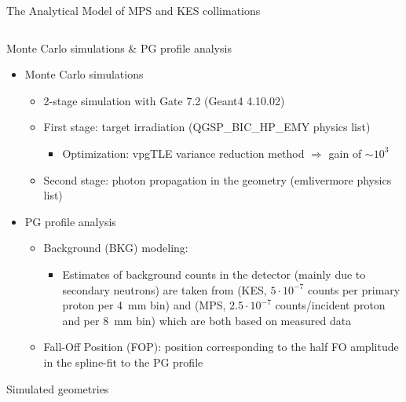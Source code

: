 \documentclass[final]{beamer} %
\begin{document}
\begin{frame}{}
\begin{columns}[t]
\begin{column}{0.49\textwidth}
\begin{block}{The Analytical Model of MPS and KES collimations}
\begin{columns}[t]
\begin{column}{0.49\textwidth}
				\end{column}
			\end{columns}
	  \end{block}
		
	  \begin{block}{Monte Carlo simulations \& PG profile analysis}
			
			\begin{itemize}
				\item Monte Carlo simulations
				\begin{itemize}
					\item 2-stage simulation with Gate 7.2 (Geant4 4.10.02)
					\item First stage: target irradiation (QGSP\_BIC\_HP\_EMY physics list)
					\begin{itemize}
						\item Optimization: vpgTLE variance reduction method $\Rightarrow$ gain of $\sim 10^3$ \cite{Huisman2016}
					\end{itemize}
					\item Second stage: photon propagation in the geometry (emlivermore physics list)
				\end{itemize}					
				\item PG profile analysis
				\begin{itemize}				
					\item Background (BKG) modeling: 
					\begin{itemize}
						\item Estimates of background counts in the detector (mainly due to secondary neutrons) are taken from \cite{Perali2014} (KES, $5 \cdot 10^{-7}$ counts per primary proton per 4~mm bin) and \cite{Pinto2014} (MPS, $2.5\cdot10^{-7}$ counts/incident proton and per 8~mm bin) which are both based on measured data
					\end{itemize}				
					\item Fall-Off Position (FOP): position corresponding to the half FO amplitude in the spline-fit to the PG profile
			\end{itemize}



			\end{itemize}

	  \end{block}		
		
		\begin{block}{Simulated geometries}
		

\end{block}
\end{column}
\end{columns}
\end{frame}
\end{document}
